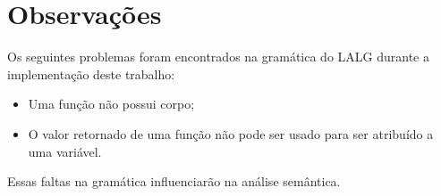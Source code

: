 \section{Observações}

Os seguintes problemas foram encontrados na gramática do LALG durante a implementação deste trabalho:

\begin{itemize}

	\item Uma função não possui corpo;
	
	\item O valor retornado de uma função não pode ser usado para ser atribuído a uma variável.

\end{itemize}

Essas faltas na gramática influenciarão na análise semântica.